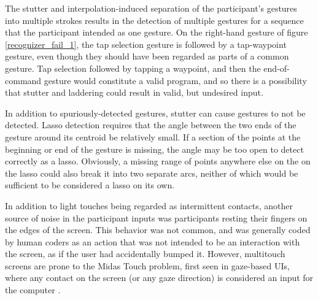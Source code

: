 The stutter and interpolation-induced separation of the  participant's gestures into multiple strokes results in the detection of multiple gestures for a sequence that the participant intended as one gesture. 
On the right-hand gesture of figure \ref{recognizer_fail_1}, the tap selection gesture is followed by a tap-waypoint gesture, even though they should have been regarded as parts of a common gesture. 
Tap selection followed by tapping a waypoint, and then the end-of-command gesture would constitute a valid program, and so there is a possibility that stutter and laddering could result in valid, but undesired input. 

In addition to spuriously-detected gestures, stutter can cause gestures to not be detected. 
Lasso detection requires that the angle between the two ends of the gesture around its centroid be relatively small. 
If a section of the points at the beginning or end of the gesture is missing, the angle may be too open to detect correctly as a lasso. 
Obviously, a missing range of points anywhere else on the on the lasso could also break it into two separate arcs, neither of which would be sufficient to be considered a lasso on its own. 

In addition to light touches being regarded as intermittent contacts, another source of noise in the participant inputs was participants resting their fingers on the edges of the screen. 
This behavior was not common, and was generally coded by human coders as an action that was not intended to be an interaction with the screen, as if the user had accidentally bumped it. 
However, multitouch screens are prone to the Midas Touch problem, first seen in gaze-based UIs, where any contact on the screen (or any gaze direction) is considered an input for the computer \cite{jacob1990you}. 

